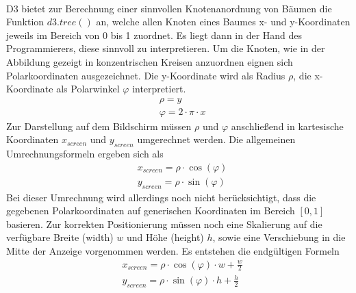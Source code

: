 \\
D3 bietet zur Berechnung einer sinnvollen Knotenanordnung von Bäumen die Funktion $d3.tree()$ an, welche allen Knoten eines Baumes x- und y-Koordinaten jeweils im Bereich von 0 bis 1 zuordnet. Es liegt dann in der Hand des Programmierers, diese sinnvoll zu interpretieren. Um die Knoten, wie in der Abbildung gezeigt in konzentrischen Kreisen anzuordnen eignen sich Polarkoordinaten ausgezeichnet. Die y-Koordinate wird als Radius $\rho$, die x-Koordinate als Polarwinkel $\varphi$ interpretiert.
\begin{align}
&\rho = y\\
&\varphi = 2 \cdot \pi \cdot x
\end{align}
Zur Darstellung auf dem Bildschirm müssen $\rho$ und $\varphi$ anschließend in kartesische Koordinaten $x_{screen}$ und $y_{screen}$ umgerechnet werden. Die allgemeinen Umrechnungsformeln ergeben sich als
\begin{align}
&x_{screen} = \rho \cdot \cos (\varphi)\\
&y_{screen} = \rho \cdot \sin (\varphi)
\end{align}
Bei dieser Umrechnung wird allerdings noch nicht berücksichtigt, dass die gegebenen Polarkoordinaten auf generischen Koordinaten im Bereich $[0,1]$ basieren. Zur korrekten Positionierung müssen noch eine Skalierung auf die verfügbare Breite (width) $w$ und Höhe (height) $h$, sowie eine Verschiebung in die Mitte der Anzeige vorgenommen werden. Es entstehen die endgültigen Formeln
\begin{align}
&x_{screen} = \rho \cdot \cos (\varphi) \cdot w + \frac{w}{2}\\
&y_{screen} = \rho \cdot \sin (\varphi) \cdot h + \frac{h}{2}
\end{align}